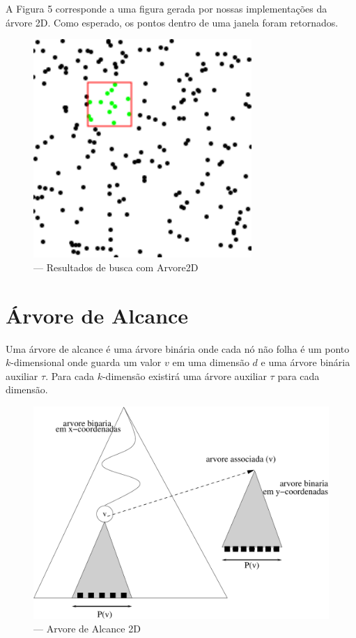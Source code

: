A Figura 5 corresponde a uma figura gerada por nossas implementações da árvore 2D. Como esperado, os
pontos dentro de uma janela foram retornados.
\begin{figure}[H][scale=0.5]
    \caption{\label{fig:Fig_54} — Resultados de busca com Arvore2D}
    \begin{center}
        \includegraphics{images/points.pdf}
    \end{center}
\end{figure}
\clearpage



\section{Árvore de Alcance}

Uma árvore de alcance é  uma árvore binária onde cada nó não folha é um ponto $k$-dimensional
onde guarda um valor $v$ em uma dimensão $d$ e uma árvore binária auxiliar $\tau$. Para cada $k$-dimensão
existirá uma árvore auxiliar $\tau$ para cada dimensão.

\begin{figure}[htb]
    \caption{\label{fig:Fig_26} — Arvore de Alcance 2D}
    \begin{center}
        \includegraphics[scale=0.5]{images/range_tree1.pdf}
    \end{center}
\end{figure}

